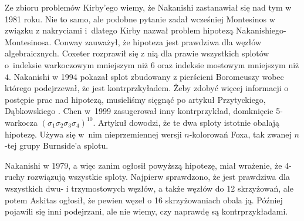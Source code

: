Ze zbioru problemów Kirby'ego \cite{kirby1978} wiemy, że Nakanishi zastanawiał się nad tym w 1981 roku.
%
Nie to samo, ale podobne pytanie zadał wcześniej Montesinos w związku z nakryciami i~dlatego Kirby nazwał problem hipotezą Nakanishiego-Montesinosa.
%
Conway zauważył, że hipoteza jest prawdziwa dla węzłów algebraicznych.
%
Coxeter rozprawił się z nią dla prawie wszystkich splotów o~indeksie warkoczowym mniejszym niż $6$ oraz indeksie mostowym mniejszym niż $4$.
%
Nakanishi w 1994 pokazał splot zbudowany z pierścieni Boromeuszy wobec którego podejrzewał, że jest kontrprzkyładem.
%
Żeby zdobyć więcej informacji o postępie prac nad hipotezą, musieliśmy sięgnąć po artykuł Przytyckiego, Dąbkowskiego \cite{dabkowski2002}.
%
%
Chen w~1999 zasugerował inny kontrprzykład, domknięcie 5-warkocza $(\sigma_1\sigma_2\sigma_3\sigma_4)^{10}$.
%
Artykuł \cite{dabkowski2002} dowodzi, że te dwa sploty istotnie obalają hipotezę.
Używa się w~nim nieprzemiennej wersji $n$-kolorowań Foxa, tak zwanej $n$-tej grupy Burnside'a splotu.
%
%

Nakanishi w 1979, a więc zanim ogłosił powyższą hipotezę, miał wrażenie, że $4$-ruchy rozwiązują wszystkie sploty.
Najpierw sprawdzono, że jest prawdziwa dla wszystkich dwu- i trzymostowych węzłów, a także węzłów do 12 skrzyżowań, ale potem Askitas ogłosił, że pewien węzeł o 16 skrzyżowaniach obala ją.
%
Później pojawili się inni podejrzani, ale nie wiemy, czy naprawdę są kontrprzykładami.


%


